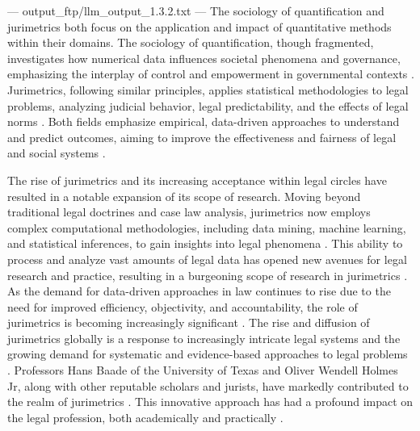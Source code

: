 ---
output_ftp/llm_output_1.3.2.txt
---
The sociology of quantification and jurimetrics both focus on the application and impact of quantitative methods within their domains. The sociology of quantification, though fragmented, investigates how numerical data influences societal phenomena and governance, emphasizing the interplay of control and empowerment in governmental contexts \cite{demortain2019, paiva2021}. Jurimetrics, following similar principles, applies statistical methodologies to legal problems, analyzing judicial behavior, legal predictability, and the effects of legal norms \cite{nunes2018, loevinger1949}. Both fields emphasize empirical, data-driven approaches to understand and predict outcomes, aiming to improve the effectiveness and fairness of legal and social systems \cite{demortain2019, paiva2021, nunes2018, loevinger1949}.

The rise of jurimetrics and its increasing acceptance within legal circles have resulted in a notable expansion of its scope of research. Moving beyond traditional legal doctrines and case law analysis, jurimetrics now employs complex computational methodologies, including data mining, machine learning, and statistical inferences, to gain insights into legal phenomena \cite{losano2006}. This ability to process and analyze vast amounts of legal data has opened new avenues for legal research and practice, resulting in a burgeoning scope of research in jurimetrics \cite{losano2006}. As the demand for data-driven approaches in law continues to rise due to the need for improved efficiency, objectivity, and accountability, the role of jurimetrics is becoming increasingly significant \cite{losano2006}. The rise and diffusion of jurimetrics globally is a response to increasingly intricate legal systems and the growing demand for systematic and evidence-based approaches to legal problems \cite{brunaarmonascolombopedrobuckviniciusmianabezerra}. Professors Hans Baade of the University of Texas and Oliver Wendell Holmes Jr, along with other reputable scholars and jurists, have markedly contributed to the realm of jurimetrics \cite{loevinger1959}. This innovative approach has had a profound impact on the legal profession, both academically and practically \cite{loevinger1959}.

